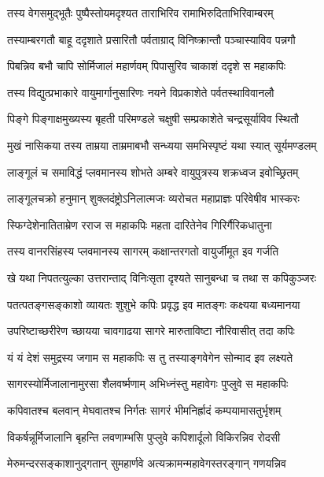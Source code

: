 \twolineshloka
{तस्य वेगसमुद्भूतैः पुष्पैस्तोयमदृश्यत}
{ताराभिरिव रामाभिरुदिताभिरिवाम्बरम्} %

\twolineshloka
{तस्याम्बरगतौ बाहू ददृशाते प्रसारितौ}
{पर्वताग्राद् विनिष्क्रान्तौ पञ्चास्याविव पन्नगौ} %

\twolineshloka
{पिबन्निव बभौ चापि सोर्मिजालं महार्णवम्}
{पिपासुरिव चाकाशं ददृशे स महाकपिः} %

\twolineshloka
{तस्य विद्युत्प्रभाकारे वायुमार्गानुसारिणः}
{नयने विप्रकाशेते पर्वतस्थाविवानलौ} %

\twolineshloka
{पिङ्गे पिङ्गाक्षमुख्यस्य बृहती परिमण्डले}
{चक्षुषी सम्प्रकाशेते चन्द्रसूर्याविव स्थितौ} %

\twolineshloka
{मुखं नासिकया तस्य ताम्रया ताम्रमाबभौ}
{सन्ध्यया समभिस्पृष्टं यथा स्यात् सूर्यमण्डलम्} %

\twolineshloka
{लाङ्गूलं च समाविद्धं प्लवमानस्य शोभते}
{अम्बरे वायुपुत्रस्य शक्रध्वज इवोच्छ्रितम्} %

\twolineshloka
{लाङ्गूलचक्रो हनुमान् शुक्लदंष्ट्रोऽनिलात्मजः}
{व्यरोचत महाप्राज्ञः परिवेषीव भास्करः} %

\twolineshloka
{स्फिग्देशेनातिताम्रेण रराज स महाकपिः}
{महता दारितेनेव गिरिर्गैरिकधातुना} %

\twolineshloka
{तस्य वानरसिंहस्य प्लवमानस्य सागरम्}
{कक्षान्तरगतो वायुर्जीमूत इव गर्जति} %

\twolineshloka
{खे यथा निपतत्युल्का उत्तरान्ताद् विनिःसृता}
{दृश्यते सानुबन्धा च तथा स कपिकुञ्जरः} %

\twolineshloka
{पतत्पतङ्गसङ्काशो व्यायतः शुशुभे कपिः}
{प्रवृद्ध इव मातङ्गः कक्ष्यया बध्यमानया} %

\twolineshloka
{उपरिष्टाच्छरीरेण च्छायया चावगाढया}
{सागरे मारुताविष्टा नौरिवासीत् तदा कपिः} %

\twolineshloka
{यं यं देशं समुद्रस्य जगाम स महाकपिः}
{स तु तस्याङ्गवेगेन सोन्माद इव लक्ष्यते} %

\twolineshloka
{सागरस्योर्मिजालानामुरसा शैलवर्ष्मणाम्}
{अभिध्नंस्तु महावेगः पुप्लुवे स महाकपिः} %

\twolineshloka
{कपिवातश्च बलवान् मेघवातश्च निर्गतः}
{सागरं भीमनिर्ह्रादं कम्पयामासतुर्भृशम्} %

\twolineshloka
{विकर्षन्नूर्मिजालानि बृहन्ति लवणाम्भसि}
{पुप्लुवे कपिशार्दूलो विकिरन्निव रोदसी} %

\twolineshloka
{मेरुमन्दरसङ्काशानुद्गतान् सुमहार्णवे}
{अत्यक्रामन्महावेगस्तरङ्गान् गणयन्निव} %

